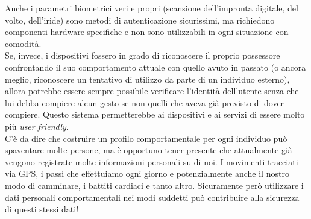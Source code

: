 Anche i parametri biometrici veri e propri (scansione dell'impronta digitale, del volto, dell'iride) sono metodi di autenticazione sicurissimi, ma richiedono componenti hardware specifiche e non sono utilizzabili in ogni situazione con comodità.\\
Se, invece, i dispositivi fossero in grado di riconoscere il proprio possessore confrontando il suo comportamento attuale con quello avuto in passato (o ancora meglio, riconoscere un tentativo di utilizzo da parte di un individuo esterno), allora potrebbe essere sempre possibile verificare l'identità dell'utente senza che lui debba compiere alcun gesto se non quelli che aveva già previsto di dover compiere. Questo sistema permetterebbe ai dispositivi e ai servizi di essere molto più \emph{user friendly}.\\
C'è da dire che costruire un profilo comportamentale per ogni individuo può spaventare molte persone, ma è opportuno tener presente che attualmente già vengono registrate molte informazioni personali su di noi. I movimenti tracciati via GPS, i passi che effettuiamo ogni giorno e potenzialmente anche il nostro modo di camminare, i battiti cardiaci e tanto altro. Sicuramente però utilizzare i dati personali comportamentali nei modi suddetti può contribuire alla sicurezza di questi stessi dati!


